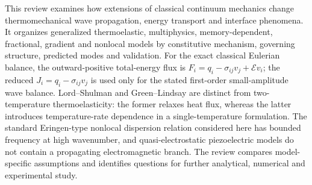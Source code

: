 This review examines how extensions of classical continuum mechanics change thermomechanical wave propagation, energy transport and interface phenomena. It organizes generalized thermoelastic, multiphysics, memory-dependent, fractional, gradient and nonlocal models by constitutive mechanism, governing structure, predicted modes and validation. For the exact classical Eulerian balance, the outward-positive total-energy flux is $F_i=q_i-\sigma_{ij}v_j+\mathcal{E}v_i$; the reduced $J_i=q_i-\sigma_{ij}v_j$ is used only for the stated first-order small-amplitude wave balance. Lord--Shulman and Green--Lindsay are distinct from two-temperature thermoelasticity: the former relaxes heat flux, whereas the latter introduces temperature-rate dependence in a single-temperature formulation. The standard Eringen-type nonlocal dispersion relation considered here has bounded frequency at high wavenumber, and quasi-electrostatic piezoelectric models do not contain a propagating electromagnetic branch. The review compares model-specific assumptions and identifies questions for further analytical, numerical and experimental study.
